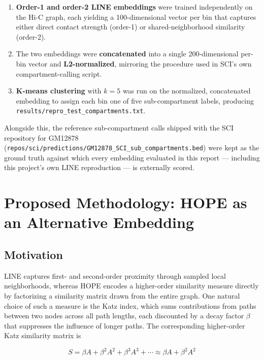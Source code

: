 \documentclass[12pt]{article}
\begin{document}
\begin{enumerate}
    \item \textbf{Order-1 and order-2 LINE embeddings} were trained independently on the Hi-C
    graph, each yielding a 100-dimensional vector per bin that captures either direct contact
    strength (order-1) or shared-neighborhood similarity (order-2).
    \item The two embeddings were \textbf{concatenated} into a single 200-dimensional
    per-bin vector and \textbf{L2-normalized}, mirroring the procedure used in SCI's own
    compartment-calling script.
    \item \textbf{K-means clustering} with $k=5$ was run on the normalized, concatenated
    embedding to assign each bin one of five sub-compartment labels, producing
    \texttt{results/\allowbreak repro\_test\_compartments.txt}.
\end{enumerate}

Alongside this, the reference sub-compartment calls shipped with the SCI repository for GM12878
(\texttt{repos/sci/predictions/\allowbreak GM12878\_SCI\_sub\_compartments.bed}) were kept as the
ground truth against which every embedding evaluated in this report — including this project's
own LINE reproduction — is externally scored.

\section{Proposed Methodology: HOPE as an Alternative Embedding}

\subsection{Motivation}
LINE captures first- and second-order proximity through sampled local neighborhoods, whereas
HOPE encodes a higher-order similarity measure directly by factorizing a similarity matrix drawn
from the entire graph. One natural choice of such a measure is the Katz index, which sums
contributions from paths between two nodes across all path lengths, each discounted by a decay
factor $\beta$ that suppresses the influence of longer paths. The corresponding higher-order Katz
similarity matrix is

\begin{equation}
    S = \beta A + \beta^2 A^2 + \beta^3 A^3 + \cdots \approx \beta A + \beta^2 A^2
\end{equation}
\end{document}
